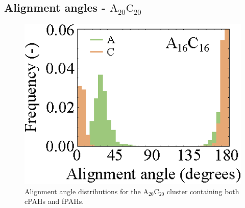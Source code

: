 \subsection{Alignment angles - $\text{A}_{\text{20}}\text{C}_{\text{20}}$}
%
\begin{figure}[!tbh]
\centering
\includegraphics[width=0.5\linewidth]{Figures/alignment_angles_ann20cor20.eps}
\caption{Alignment angle distributions for the $\text{A}_{\text{20}}\text{C}_{\text{20}}$ cluster containing both cPAHs and fPAHs.}
\label{figSI:alignmentangles_ann20cor20}
\end{figure}
%

